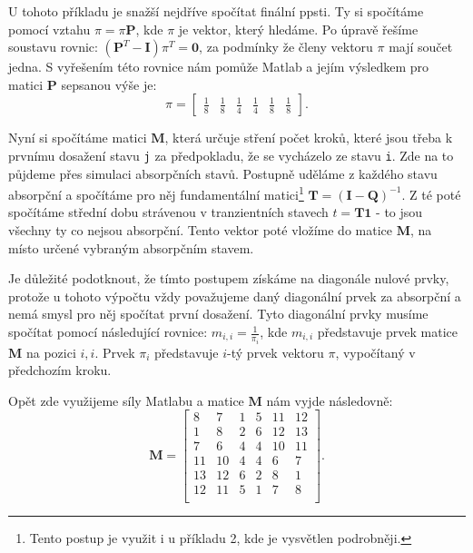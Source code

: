 \documentclass{article}
\begin{document}
U tohoto příkladu je snažší nejdříve spočítat finální ppsti.  Ty si spočítáme pomocí vztahu $\pi = \pi \mathbf{P}$, kde $\pi$ je vektor, který hledáme. Po úpravě řešíme soustavu rovnic: $(\mathbf{P}^T - \mathbf{I})\pi^T = \mathbf{0}$, za podmínky že členy vektoru $\pi$ mají součet jedna.
S vyřešením této rovnice nám pomůže Matlab a jejím výsledkem pro matici $\mathbf P$ sepsanou výše je:
\[
\pi = 
\begin{bmatrix}
    \frac 1 8 & \frac 1 8 & \frac 1 4 & \frac 1 4 &  \frac 1 8 & \frac 1 8 
\end{bmatrix}.
\]

Nyní si spočítáme matici $\mathbf{M}$, která určuje stření počet kroků, které jsou třeba k prvnímu dosažení stavu \verb|j| za předpokladu, že se vycházelo ze stavu \verb|i|. 
Zde na to půjdeme přes simulaci absorpčních stavů. 
Postupně uděláme z každého stavu absorpční a spočítáme pro něj fundamentální matici\footnote{Tento postup je využit i u příkladu 2, kde je vysvětlen podrobněji.} $\mathbf{T} = (\mathbf{I} - \mathbf{Q})^{-1}$.
Z té poté spočítáme střední dobu strávenou v tranzientních stavech $t = \mathbf{T}\mathbf{1}$ - to jsou všechny ty co nejsou absorpční. 
Tento vektor poté vložíme do matice $\mathbf{M}$, na místo určené vybraným absorpčním stavem. 

Je důležité podotknout, že tímto postupem získáme na diagonále nulové prvky, protože u tohoto výpočtu vždy považujeme daný diagonální prvek za absorpční a nemá smysl pro něj spočítat první dosažení.
Tyto diagonální prvky musíme spočítat pomocí následující rovnice: $m_{i,i}=\frac{1}{\pi_i}$, kde $m_{i,i}$ představuje prvek matice $\mathbf{M}$ na pozici $i,i$. Prvek $\pi_i$ představuje $i$-tý prvek vektoru $\pi$, vypočítaný v předchozím kroku.

Opět zde využijeme síly Matlabu a matice $\mathbf{M}$ nám vyjde následovně:
\[
    \mathbf{M} = 
\begin{bmatrix}
8 & 7 & 1 & 5 & 11 & 12 \\
1 & 8 & 2 & 6 & 12 & 13 \\
7 & 6 & 4 & 4 & 10 & 11 \\
11 & 10 & 4 & 4 & 6 & 7 \\
13 & 12 & 6 & 2 & 8 & 1 \\
12 & 11 & 5 & 1 & 7 & 8 \\
\end{bmatrix}.
\]
\end{document}
